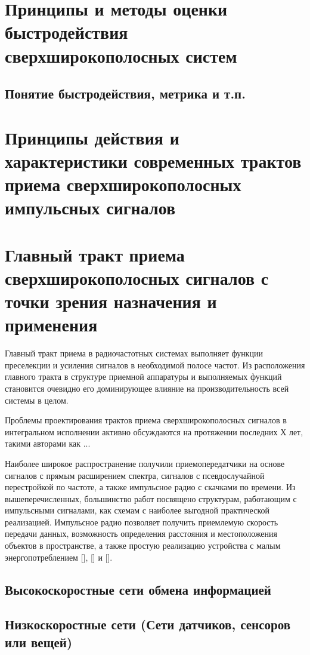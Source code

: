 \section{Принципы и методы оценки быстродействия сверхширокополосных систем}

\subsection{Понятие быстродействия, метрика и т.п.}

\section{Принципы действия и характеристики современных трактов приема сверхширокополосных импульсных сигналов}

\section{Главный тракт приема сверхширокополосных сигналов с точки зрения назначения и применения}
Главный тракт приема в радиочастотных системах выполняет функции преселекции и усиления сигналов в необходимой полосе частот. Из расположения главного тракта в структуре приемной аппаратуры и выполняемых функций становится очевидно его доминирующее влияние на производительность всей системы в целом.

Проблемы проектирования трактов приема сверхширокополосных сигналов в интегральном исполнении активно обсуждаются на протяжении последних Х лет, такими авторами как ...

Наиболее широкое распространение получили приемопередатчики на основе сигналов с прямым расширением спектра, сигналов с псевдослучайной перестройкой по частоте, а также импульсное радио с скачками по времени. Из вышеперечисленных, большинство работ посвящено структурам, работающим с импульсными сигналами, как схемам с наиболее выгодной практической реализацией. Импульсное радио позволяет получить приемлемую скорость передачи данных, возможность определения расстояния и  местоположения объектов в пространстве, а также простую реализацию устройства с малым энергопотреблением [], [] и [].

\subsection{Высокоскоростные сети обмена информацией}

\subsection{Низкоскоростные сети (Сети датчиков, сенсоров или вещей)}


